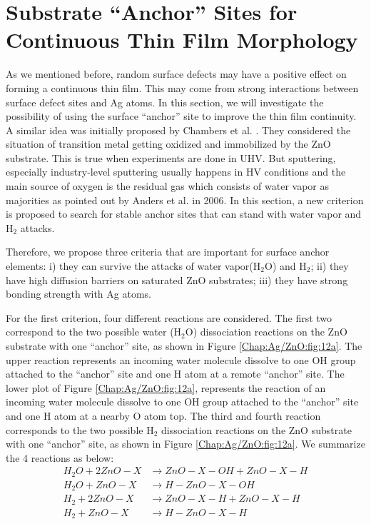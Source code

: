 \section{Substrate ``Anchor'' Sites for Continuous Thin Film Morphology}
\label{Chap:Ag/ZnO:section:anchor}

As we mentioned before, random surface defects may have a positive effect on forming a continuous thin film. This may come from strong interactions between surface defect sites and Ag atoms. In this section, we will investigate the possibility of using the surface ``anchor'' site to improve the thin film continuity. A similar idea was initially proposed by Chambers et al. \cite{chambers2002laminar}. They considered the situation of transition metal getting oxidized and immobilized by the ZnO substrate. This is true when experiments are done in \ac{UHV}. But sputtering, especially industry-level sputtering usually happens in \ac{HV} conditions and the main source of oxygen is the residual gas which consists of water vapor as majorities as pointed out by Anders et al. \cite{anders2006smoothing} in 2006. In this section, a new criterion is proposed to search for stable anchor sites that can stand with water vapor and $\text{H}_{\text{2}}$ attacks.

Therefore, we propose three criteria that are important for surface anchor elements: i) they can survive the attacks of water vapor($\text{H}_{\text{2}}\text{O}$) and $\text{H}_{\text{2}}$; ii) they have high diffusion barriers on saturated ZnO substrates; iii) they have strong bonding strength with Ag atoms.

For the first criterion, four different reactions are considered. The first two correspond to the two possible water ($\text{H}_{\text{2}}\text{O}$) dissociation reactions on the ZnO substrate with one ``anchor'' site, as shown in Figure \ref{Chap:Ag/ZnO:fig:12a}. The upper reaction represents an incoming water molecule dissolve to one OH group attached to the ``anchor'' site and one H atom at a remote ``anchor'' site. The lower plot of Figure \ref{Chap:Ag/ZnO:fig:12a}, represents the reaction of an incoming water molecule dissolve to one OH group attached to the ``anchor'' site and one H atom at a nearby O atom top. The third and fourth reaction corresponds to the two possible $\text{H}_{\text{2}}$ dissociation reactions on the ZnO substrate with one ``anchor'' site, as shown in Figure \ref{Chap:Ag/ZnO:fig:12a}. We summarize the 4 reactions as below:
\begin{subequations}
\begin{align}
H_2O + 2 ZnO-X & \rightarrow ZnO-X-OH + ZnO-X-H
 \label{Chap:Ag/ZnO:eq:anchor1}\\
H_2O + ZnO-X & \rightarrow H-ZnO-X-OH
 \label{Chap:Ag/ZnO:eq:anchor2}\\
H_2 + 2 ZnO-X & \rightarrow ZnO-X-H + ZnO-X-H
 \label{Chap:Ag/ZnO:eq:anchor3}\\
H_2 + ZnO-X & \rightarrow H-ZnO-X-H
 \label{Chap:Ag/ZnO:eq:anchor4}
\end{align}
\end{subequations}


